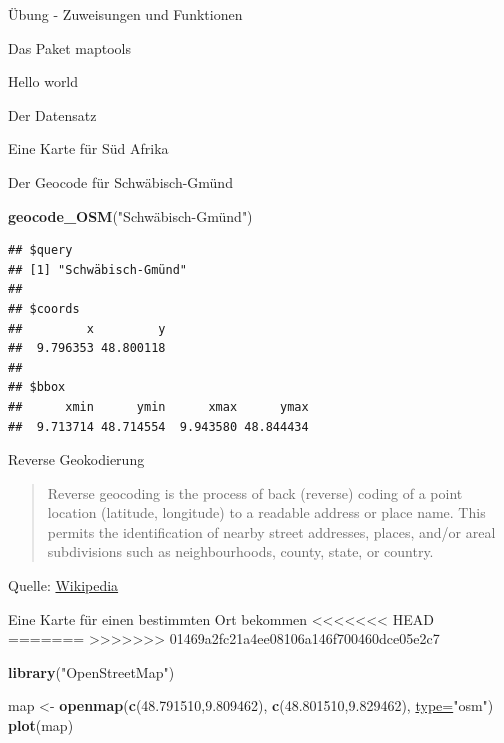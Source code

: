 \documentclass[ignorenonframetext,]{beamer}
\newenvironment{Shaded}{\begin{snugshade}}{\end{snugshade}}
\newcommand{\DataTypeTok}[1]{\textcolor[rgb]{0.74,0.68,0.62}{\underline{#1}}}
\newcommand{\FloatTok}[1]{\textcolor[rgb]{0.27,0.67,0.26}{#1}}
\newcommand{\KeywordTok}[1]{\textcolor[rgb]{0.26,0.66,0.93}{\textbf{#1}}}
\newcommand{\NormalTok}[1]{\textcolor[rgb]{0.74,0.68,0.62}{#1}}
\newcommand{\StringTok}[1]{\textcolor[rgb]{0.02,0.61,0.04}{#1}}
\begin{document}
\begin{frame}[fragile]{Übung - Zuweisungen und Funktionen}
\begin{frame}[fragile]{Das Paket maptools}
\begin{frame}[fragile]{Hello world}
\begin{frame}[fragile]{Der Datensatz}
\begin{frame}[fragile]{Eine Karte für Süd Afrika}
\begin{frame}[fragile]{Der Geocode für Schwäbisch-Gmünd}
\protect\hypertarget{der-geocode-fur-schwabisch-gmund}{}

\begin{Shaded}
\begin{Highlighting}[]
\KeywordTok{geocode_OSM}\NormalTok{(}\StringTok{"Schwäbisch-Gmünd")}
\end{Highlighting}
\end{Shaded}

\begin{verbatim}
## $query
## [1] "Schwäbisch-Gmünd"
## 
## $coords
##         x         y 
##  9.796353 48.800118 
## 
## $bbox
##      xmin      ymin      xmax      ymax 
##  9.713714 48.714554  9.943580 48.844434
\end{verbatim}

\end{frame}

\begin{frame}{Reverse Geokodierung}
\protect\hypertarget{reverse-geokodierung}{}

\begin{quote}
Reverse geocoding is the process of back (reverse) coding of a point
location (latitude, longitude) to a readable address or place name. This
permits the identification of nearby street addresses, places, and/or
areal subdivisions such as neighbourhoods, county, state, or country.
\end{quote}

Quelle:
\href{https://en.wikipedia.org/wiki/Reverse_geocoding}{Wikipedia}

\end{frame}

\begin{frame}[fragile]{Eine Karte für einen bestimmten Ort bekommen}
<<<<<<< HEAD
\protect\hypertarget{eine-karte-fur-einen-bestimmten-ort-bekommen}{}
=======
>>>>>>> 01469a2fc21a4ee08106a146f700460dce05e2c7

\begin{Shaded}
\begin{Highlighting}[]
\KeywordTok{library}\NormalTok{(}\StringTok{"OpenStreetMap"}\NormalTok{)}

\NormalTok{map <-}\StringTok{ }\KeywordTok{openmap}\NormalTok{(}\KeywordTok{c}\NormalTok{(}\FloatTok{48.791510}\NormalTok{,}\FloatTok{9.809462}\NormalTok{),}
               \KeywordTok{c}\NormalTok{(}\FloatTok{48.801510}\NormalTok{,}\FloatTok{9.829462}\NormalTok{),}
               \DataTypeTok{type=}\StringTok{"osm"}\NormalTok{)}
\KeywordTok{plot}\NormalTok{(map)}
\end{Highlighting}
\end{Shaded}


\end{frame}
\end{frame}
\end{frame}
\end{frame}
\end{frame}
\end{frame}
\end{document}
